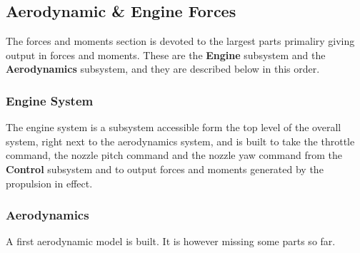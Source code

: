 \subsection{Aerodynamic \& Engine Forces}

The forces and moments section is devoted to the largest parts primaliry giving output in forces and moments. These are the \textbf{Engine} subsystem and the \textbf{Aerodynamics} subsystem, and they are described below in this order.

\subsubsection{Engine System}

The engine system is a subsystem accessible form the top level of the overall system, right next to the aerodynamics system, and is built to take the throttle command, the nozzle pitch command and the nozzle yaw command from the \textbf{Control} subsystem and to output forces and moments generated by the propulsion in effect.


\subsubsection{Aerodynamics}

A first aerodynamic model is built. It is however missing some parts so far.


